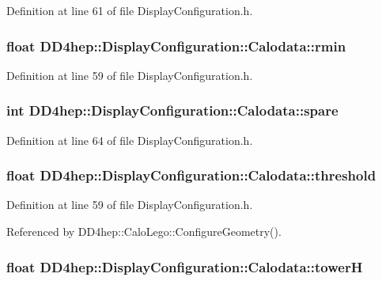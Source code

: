 Definition at line 61 of file DisplayConfiguration.h.\hypertarget{struct_d_d4hep_1_1_display_configuration_1_1_calodata_ad66aad4f3af180d086d38e843e85aacf}{
\subsubsection[{rmin}]{\setlength{\rightskip}{0pt plus 5cm}float {\bf DD4hep::DisplayConfiguration::Calodata::rmin}}}
\label{struct_d_d4hep_1_1_display_configuration_1_1_calodata_ad66aad4f3af180d086d38e843e85aacf}


Definition at line 59 of file DisplayConfiguration.h.\hypertarget{struct_d_d4hep_1_1_display_configuration_1_1_calodata_abda3e84b84be3024b62145411f0f125e}{
\subsubsection[{spare}]{\setlength{\rightskip}{0pt plus 5cm}int {\bf DD4hep::DisplayConfiguration::Calodata::spare}}}
\label{struct_d_d4hep_1_1_display_configuration_1_1_calodata_abda3e84b84be3024b62145411f0f125e}


Definition at line 64 of file DisplayConfiguration.h.\hypertarget{struct_d_d4hep_1_1_display_configuration_1_1_calodata_a83c052550585418a3f64e5b1b34d5d76}{
\subsubsection[{threshold}]{\setlength{\rightskip}{0pt plus 5cm}float {\bf DD4hep::DisplayConfiguration::Calodata::threshold}}}
\label{struct_d_d4hep_1_1_display_configuration_1_1_calodata_a83c052550585418a3f64e5b1b34d5d76}


Definition at line 59 of file DisplayConfiguration.h.

Referenced by DD4hep::CaloLego::ConfigureGeometry().\hypertarget{struct_d_d4hep_1_1_display_configuration_1_1_calodata_a9b1ac13cbc2a38b0b9fed9d8d431060c}{
\subsubsection[{towerH}]{\setlength{\rightskip}{0pt plus 5cm}float {\bf DD4hep::DisplayConfiguration::Calodata::towerH}}}
\label{struct_d_d4hep_1_1_display_configuration_1_1_calodata_a9b1ac13cbc2a38b0b9fed9d8d431060c}


